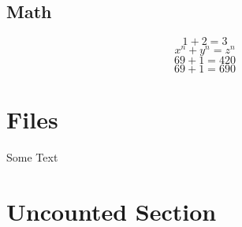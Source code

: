 \subsection{Math}
\label{math}
$$1+2 = 3$$
\[x^n + y^n = z^n\]
\begin{displaymath}
69 + 1 = 420
\end{displaymath}
\begin{equation}
69 + 1 = 690
\end{equation}
\section{Files}
Some Text


\section*{Uncounted Section}

